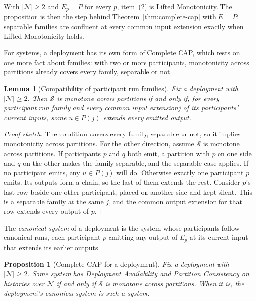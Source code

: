 \documentclass[sigconf]{cidr-2027}
\newtheorem{proposition}{Proposition}
\newtheorem{lemma}{Lemma}
\theoremstyle{remark}
\newcommand{\indesc}{input extension\xspace} %
\newcommand{\outrel}{extends\xspace}          %
\newcommand{\outnoun}{output extension\xspace}%
\newcommand{\Spec}{\mathcal{S}}
\newcommand{\fiber}[1]{P(#1)}
\begin{document}
With $|\mathcal N|\ge2$ and $E_p=P$ for every $p$, item~(2) is Lifted
Monotonicity. The proposition is then the step behind
Theorem~\ref{thm:complete-cap} with $E=P$: separable families are confluent at
every common \indesc exactly when Lifted Monotonicity holds.

For systems, a deployment has its own form of Complete CAP, which rests on one
more fact about families: with two or more participants, monotonicity across
partitions already covers every family, separable or not.

\begin{lemma}[Compatibility of participant run families]
\label{lem:deployment-compatible}
Fix a deployment with $|\mathcal N|\ge2$. Then $\Spec$ is monotone across
partitions if and only if, for every participant run family and every common
\indesc $j$ of its participants' current inputs, some $u\in\fiber{j}$
\outrel every emitted output.
\end{lemma}

\begin{proof}[Proof sketch]
The condition covers every family, separable or not, so it implies
monotonicity across partitions. For the other direction, assume $\Spec$ is
monotone across partitions. If participants $p$ and $q$ both emit, a
partition with $p$ on one side and $q$ on the other makes the family
separable, and the separable case applies. If no participant emits, any
$u\in\fiber{j}$ will do. Otherwise exactly one participant $p$ emits. Its
outputs form a chain, so the last of them \outrel the rest. Consider $p$'s
last row beside one other participant, placed on another side and kept
silent. This is a separable family at the same $j$, and the common \outnoun
for that row \outrel every output of $p$.
\end{proof}

The \emph{canonical system} of a deployment is the system whose participants
follow canonical runs, each participant $p$ emitting any output of $E_p$ at
its current input that extends its earlier outputs.

\begin{proposition}[Complete CAP for a deployment]
\label{prop:deployment-complete-cap}
Fix a deployment with $|\mathcal N|\ge2$. Some system has Deployment
Availability and Partition Consistency on histories over $\mathcal N$ if and
only if $\Spec$ is monotone across partitions. When it is, the deployment's
canonical system is such a system.
\end{proposition}
\end{document}

